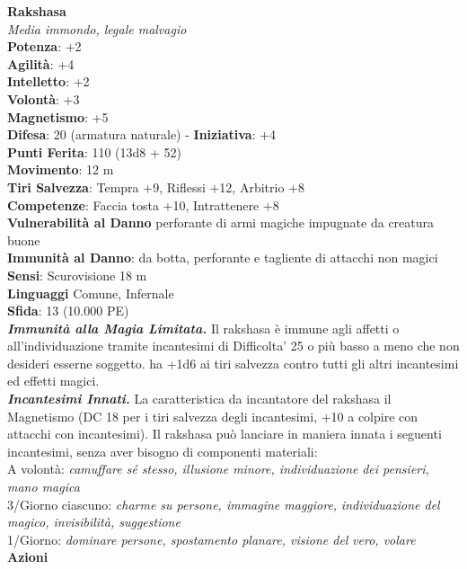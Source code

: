 \begin{multicols}{2}
\medskip\textbf{Rakshasa}\\
\emph{Media immondo, legale malvagio}\\
\textbf{Potenza}: +2\\
\textbf{Agilità}: +4\\
\textbf{Intelletto}: +2\\
\textbf{Volontà}: +3\\
\textbf{Magnetismo}: +5\\
\textbf{Difesa}: 20 (armatura naturale) - \textbf{Iniziativa}: +4\\
\textbf{Punti Ferita}: 110 (13d8 + 52)\\
\textbf{Movimento}: 12 m\\
\textbf{Tiri Salvezza}: Tempra +9, Riflessi +12, Arbitrio +8 \\
\textbf{Competenze}: Faccia tosta +10, Intrattenere +8\\
\textbf{Vulnerabilità al Danno} perforante di armi magiche impugnate da creatura buone\\
\textbf{Immunità al Danno}: da botta, perforante e tagliente di attacchi non magici\\
\textbf{Sensi}: Scurovisione 18 m\\
\textbf{Linguaggi} Comune, Infernale\\
\textbf{Sfida}: 13 (10.000 PE)\smallskip\\
\emph{\textbf{Immunità alla Magia Limitata.}} Il rakshasa è immune agli affetti o all'individuazione tramite incantesimi di Difficolta' 25 o più basso a meno che non desideri esserne soggetto. ha +1d6 ai tiri salvezza contro tutti gli altri incantesimi ed effetti magici.\\
\emph{\textbf{Incantesimi Innati.}} La caratteristica da incantatore del rakshasa il Magnetismo (DC 18 per i tiri salvezza degli incantesimi, +10 a colpire  con attacchi con incantesimi). Il rakshasa può lanciare in maniera  innata i seguenti incantesimi, senza aver bisogno di componenti  materiali:\\
A volontà: \emph{camuffare sé stesso, illusione minore, individuazione} \emph{dei pensieri, mano magica}\\
3/Giorno ciascuno: \emph{charme su persone, immagine maggiore,} \emph{individuazione del magico, invisibilità, suggestione}\\
1/Giorno: \emph{dominare persone, spostamento planare, visione del} \emph{vero, volare}\\
\smallskip\textbf{Azioni}\\

\end{multicols}
